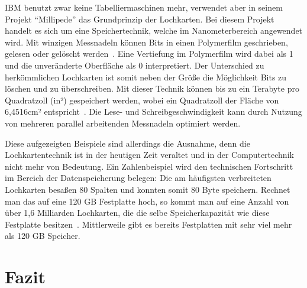 \documentclass[parskip=half]{scrartcl}
\begin{document}
IBM benutzt zwar keine Tabelliermaschinen mehr, verwendet aber in seinem
Projekt \enquote{Millipede} das Grundprinzip der Lochkarten. Bei diesem Projekt
handelt es sich um eine Speichertechnik, welche im Nanometerbereich angewendet
wird.  Mit winzigen Messnadeln können Bits in einen Polymerfilm geschrieben,
gelesen oder gelöscht werden~\cite{binnig}. Eine Vertiefung im
Polymerfilm wird dabei als 1 und die unveränderte Oberfläche als 0
interpretiert. Der Unterschied zu herkömmlichen Lochkarten ist somit neben der
Größe die Möglichkeit Bits zu löschen und zu überschreiben. Mit dieser Technik
können bis zu ein Terabyte pro Quadratzoll (in²) gespeichert werden, wobei ein
Quadratzoll der Fläche von 6,4516cm² entspricht~\cite{binnig}. Die
Lese- und Schreibgeschwindigkeit kann durch Nutzung von mehreren parallel
arbeitenden Messnadeln optimiert werden.

Diese aufgezeigten Beispiele sind allerdings die Ausnahme, denn die
Lochkartentechnik ist in der heutigen Zeit veraltet und in der Computertechnik
nicht mehr von Bedeutung. Ein Zahlenbeispiel wird den technischen Fortschritt
im Bereich der Datenspeicherung belegen: Die am häufigsten verbreiteten
Lochkarten besaßen 80 Spalten und konnten somit 80 Byte speichern. Rechnet man
das auf eine 120 GB Festplatte hoch, so kommt man auf eine Anzahl von über 1,6
Milliarden Lochkarten, die die selbe Speicherkapazität wie diese Festplatte
besitzen~\cite{roeltgen}. Mittlerweile gibt es bereits Festplatten mit sehr
viel mehr als 120 GB Speicher.

\section{Fazit}



\end{document}
